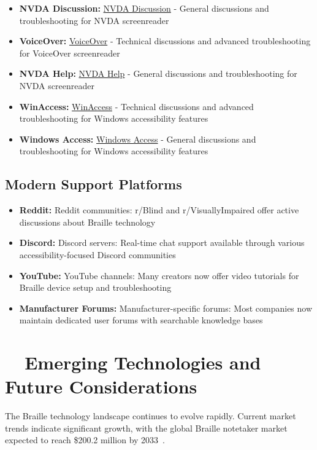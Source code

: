 \begin{itemize}
	\item \textbf{NVDA Discussion:} \href{https://groups.io/g/NVDAdiscussion/messages}{NVDA Discussion} - General discussions and troubleshooting for NVDA screenreader
	\item \textbf{VoiceOver:} \href{https://groups.io/g/voiceover/messages}{VoiceOver} - Technical discussions and advanced troubleshooting for VoiceOver screenreader
	\item \textbf{NVDA Help:} \href{https://groups.io/g/NVDAhelp/messages}{NVDA Help} - General discussions and troubleshooting for NVDA screenreader
	\item \textbf{WinAccess:} \href{https://winaccess.groups.io/g/winaccess/messages}{WinAccess} - Technical discussions and advanced troubleshooting for Windows accessibility features
	\item \textbf{Windows Access:} \href{https://groups.io/g/windows-access/messages}{Windows Access} - General discussions and troubleshooting for Windows accessibility features
\end{itemize}

\subsection{Modern Support Platforms}
\label{app2:modern-support}
\begin{itemize}
	\item \textbf{Reddit:} Reddit communities: r/Blind and r/VisuallyImpaired offer active discussions about Braille technology
	\item \textbf{Discord:} Discord servers: Real-time chat support available through various accessibility-focused Discord communities
	\item \textbf{YouTube:} YouTube channels: Many creators now offer video tutorials for Braille device setup and troubleshooting
	\item \textbf{Manufacturer Forums:} Manufacturer-specific forums: Most companies now maintain dedicated user forums with searchable knowledge bases
\end{itemize}

\section{~~Emerging Technologies and Future Considerations}
\label{app2:emerging}
The Braille technology landscape continues to evolve rapidly. Current market trends indicate significant growth, with the global Braille notetaker market expected to reach \$200.2 million by 2033~\supercite{BrailleMarketResearch}.

